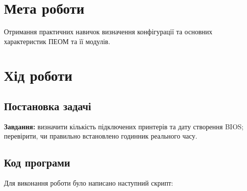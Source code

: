 \section{Мета роботи}
Отримання практичних навичок визначення конфігурації та основних характеристик ПЕОМ та її модулів.

\section{Хід роботи}
\subsection{Постановка задачі}
\textbf{Завдання:} визначити кількість підключених принтерів та дату створення BIOS;
перевірити, чи правильно встановлено годинник реального часу.

\subsection{Код програми}
Для виконання роботи було написано наступний скрипт:

